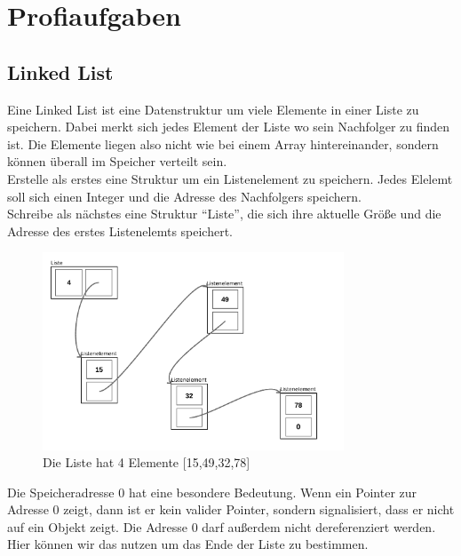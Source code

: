 \documentclass[c_worksheet.tex]{subfiles}
\begin{document}
  
\chapter{Profiaufgaben}

\section{Linked List}

Eine Linked List ist eine Datenstruktur um viele Elemente in einer Liste zu speichern. Dabei merkt sich jedes Element der Liste wo sein Nachfolger zu finden ist. Die Elemente liegen also nicht wie bei einem Array hintereinander, sondern können überall im Speicher verteilt sein. \\

Erstelle als erstes eine Struktur um ein Listenelement zu speichern. Jedes Elelemt soll sich einen Integer und die Adresse des Nachfolgers speichern. \\
Schreibe als nächstes eine Struktur ``Liste'', die sich ihre aktuelle Größe und die Adresse des erstes Listenelemts speichert.

\begin{figure}[h]
\centering
\includegraphics[width=0.8\textwidth]{./Grafiken/Aufgaben/linkedList}
\caption{Die Liste hat 4 Elemente [15,49,32,78]} 
\end{figure}

Die Speicheradresse 0 hat eine besondere Bedeutung. Wenn ein Pointer zur Adresse 0 zeigt, dann ist er kein valider Pointer, sondern signalisiert, dass er nicht auf ein Objekt zeigt. Die Adresse 0 darf außerdem nicht dereferenziert werden. Hier können wir das nutzen um das Ende der Liste zu bestimmen.\\
\end{document}
